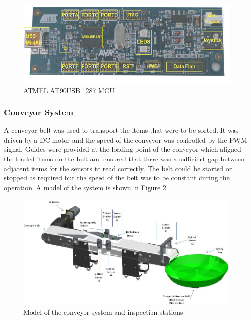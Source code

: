 \begin{figure}[tbph]
	\centering
	\includegraphics[width=0.80\linewidth]{"images/mcu"}
	\caption{ATMEL AT90USB 1287 MCU}
	\label{fig:mcu}
\end{figure}

\subsubsection{Conveyor System}
A conveyor belt was used to transport the items that were to be sorted. It was driven by a DC motor and the speed of the conveyor was controlled by the PWM signal. Guides were provided at the loading point of the conveyor which aligned the loaded items on the belt and ensured that there was a sufficient gap between adjacent items for the sensors to read correctly. The belt could be started or stopped as required but the speed of the belt was to be constant during the operation. A model of the system is shown in Figure \ref{fig:model}.

\begin{figure}[tbph]
	\centering
	\includegraphics[width=0.89\linewidth]{"images/model"}
	\caption{Model of the conveyor system and inspection stations}
	\label{fig:model}
\end{figure}


